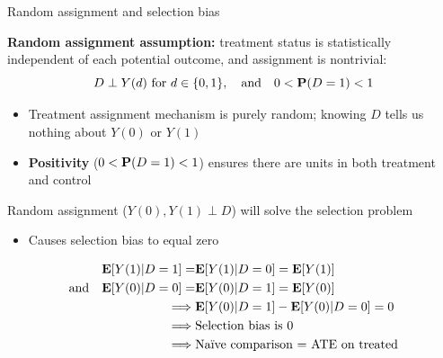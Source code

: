 \documentclass[compress, 8pt]{beamer}
\begin{document}
\begin{frame}{Random assignment and selection bias}

\textbf{Random assignment assumption:} treatment status is statistically independent of each potential outcome, and assignment is nontrivial:
\begin{equation*}
    D \perp Y(d) \ \text{for} \ d \in \{0, 1\}, \quad \text{and} \quad 0 < \mathbf{P}(D = 1) < 1
\end{equation*}
\begin{itemize}
    \item Treatment assignment mechanism is purely random; knowing $D$ tells us nothing about $Y(0)$ or $Y(1)$
    \item \textbf{Positivity} ($0 < \mathbf{P}(D=1) < 1$) ensures there are units in both treatment and control
\end{itemize}

\vspace{2ex}
Random assignment ($Y(0), Y(1) \perp D$) will solve the selection problem
\begin{itemize}
    \item Causes selection bias to equal zero
\end{itemize}
\begin{align*}
    \mathbf{E} [Y(1) \vert D = 1] =& \mathbf{E}[Y(1) \vert D = 0] = \mathbf{E} [Y(1)] \quad \\
    \text{and} \quad \mathbf{E} [Y(0) \vert D = 0] =& \mathbf{E} [Y(0) \vert D = 1] = \mathbf{E} [Y(0)] \\
    \implies&
    \mathbf{E} [Y(0) \vert D = 1] - \mathbf{E} [Y(0) \vert D = 0] = 0 \\
    \implies&
    \text{Selection bias is 0} \\
    \implies&
    \text{Na{\"i}ve comparison = ATE on treated}
\end{align*}


\end{frame}
\end{document}
